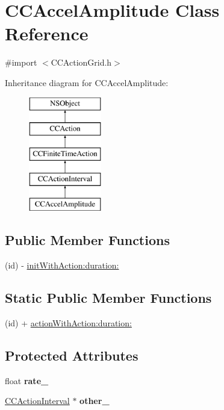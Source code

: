 \hypertarget{interface_c_c_accel_amplitude}{\section{C\-C\-Accel\-Amplitude Class Reference}
\label{interface_c_c_accel_amplitude}
}


{\ttfamily \#import $<$C\-C\-Action\-Grid.\-h$>$}

Inheritance diagram for C\-C\-Accel\-Amplitude\-:\begin{figure}[H]
\begin{center}
\leavevmode
\includegraphics[height=5.000000cm]{interface_c_c_accel_amplitude}
\end{center}
\end{figure}
\subsection*{Public Member Functions}
\begin{DoxyCompactItemize}
\item 
(id) -\/ \hyperlink{interface_c_c_accel_amplitude_afbd7141d48a2074757bdba039a9bd9d1}{init\-With\-Action\-:duration\-:}
\end{DoxyCompactItemize}
\subsection*{Static Public Member Functions}
\begin{DoxyCompactItemize}
\item 
(id) + \hyperlink{interface_c_c_accel_amplitude_a07d554e0977209015d110872ddac8300}{action\-With\-Action\-:duration\-:}
\end{DoxyCompactItemize}
\subsection*{Protected Attributes}
\begin{DoxyCompactItemize}
\item 
\hypertarget{interface_c_c_accel_amplitude_a09ddb8901c9583968a38e63cff62962c}{float {\bfseries rate\-\_\-}}\label{interface_c_c_accel_amplitude_a09ddb8901c9583968a38e63cff62962c}

\item 
\hypertarget{interface_c_c_accel_amplitude_a8d9747727042d48a2f1ac48c6fcd742e}{\hyperlink{class_c_c_action_interval}{C\-C\-Action\-Interval} $\ast$ {\bfseries other\-\_\-}}\label{interface_c_c_accel_amplitude_a8d9747727042d48a2f1ac48c6fcd742e}

\end{DoxyCompactItemize}

